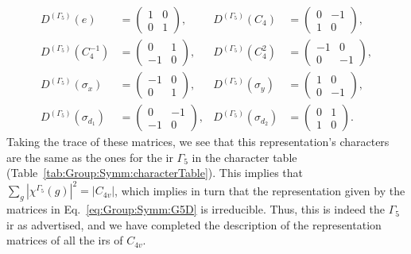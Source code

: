 \begin{subequations}
    \label{eq:Group:Symm:G5D}
\begin{align}
    D^{(\Gamma_5)}(e) &=
    \begin{pmatrix}
        1 & 0\\
        0 & 1
    \end{pmatrix}, & D^{(\Gamma_5)}(C_4) &=
    \begin{pmatrix}
        0 & -1\\
        1 & 0
    \end{pmatrix},\\
    D^{(\Gamma_5)}(C_4^{-1}) &=
    \begin{pmatrix}
        0 & 1\\
        -1 & 0
    \end{pmatrix}, & D^{(\Gamma_5)}(C_4^2) &= 
    \begin{pmatrix}
        -1 & 0\\
        0 & -1
    \end{pmatrix},\\
    D^{(\Gamma_5)}(\sigma_x) &= 
    \begin{pmatrix}
        -1 & 0\\
        0 & 1
    \end{pmatrix}, & D^{(\Gamma_5)}(\sigma_y) &=
    \begin{pmatrix}
        1 & 0\\
        0 & -1
    \end{pmatrix},\\
    D^{(\Gamma_5)}(\sigma_{d_1}) &=
    \begin{pmatrix}
        0 & -1\\
        -1 & 0
    \end{pmatrix}, & D^{(\Gamma_5)}(\sigma_{d_2}) &=
    \begin{pmatrix}
        0 & 1\\
        1 & 0
    \end{pmatrix}.
\end{align}
\end{subequations}
Taking the trace of these matrices, we see that this representation's characters are the same as the ones for the \ac{ir} $\Gamma_5$ in the character table
(Table~\ref{tab:Group:Symm:characterTable}). This implies that $\sum_g|\chi^{\Gamma_{5}}(g)|^2 = |C_{4v}|$, which implies in turn that the representation
given by the matrices in Eq.~\eqref{eq:Group:Symm:G5D} is irreducible. Thus, this is indeed the $\Gamma_5$ \ac{ir} as advertised,
and we have completed the description of the representation matrices of all the \ac{ir}s of $C_{4v}$.

